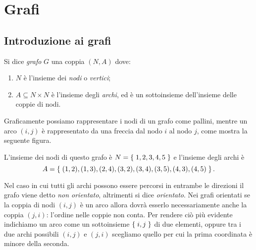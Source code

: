 \chapter{Grafi}

\section{Introduzione ai grafi}

\begin{definition}
    [Grafo]
    Si dice \emph{grafo} $G$ una coppia $(N, A)$ dove:
    \begin{enumerate}
        \item $N$ è l'insieme dei \emph{nodi} o \emph{vertici};
        \item $A \subseteq N \times N$ è l'insieme degli \emph{archi}, ed è un sottoinsieme dell'insieme delle coppie di nodi.
    \end{enumerate}
\end{definition}

Graficamente possiamo rappresentare i nodi di un grafo come pallini, mentre un arco $(i, j)$ è rappresentato da una freccia dal nodo $i$ al nodo $j$, come mostra la seguente figura.




L'insieme dei nodi di questo grafo è $N = \left\{\;1, 2, 3, 4, 5\;\right\}$ e l'insieme degli archi è \[
    A = \left\{\;(1, 2), (1, 3), (2, 4), (3, 2), (3, 4), (3, 5), (4, 3), (4, 5)\;\right\}.    
\]

Nel caso in cui tutti gli archi possono essere percorsi in entrambe le direzioni il grafo viene detto \emph{non orientato}, altrimenti si dice \emph{orientato}. Nei grafi orientati se la coppia di nodi $(i, j)$ è un arco allora dovrà esserlo necessariamente anche la coppia $(j, i)$: l'ordine nelle coppie non conta. Per rendere ciò più evidente indichiamo un arco come un sottoinsieme $\left\{\;i, j\;\right\}$ di due elementi, oppure tra i due archi possibili $(i, j)$ e $(j, i)$ scegliamo quello per cui la prima coordinata è minore della seconda.

